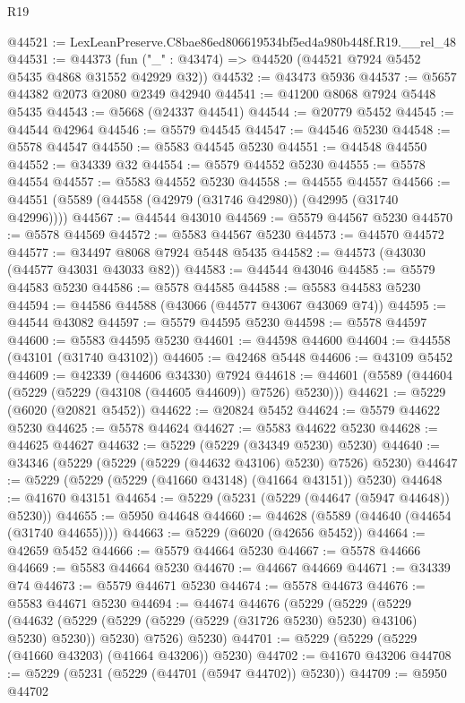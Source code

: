\begin{lexlean}{R19}
\begin{coremodule}
@44521 := LexLeanPreserve.C8bae86ed806619534bf5ed4a980b448f.R19.__rel_48
@44531 := @44373 (fun ("_" : @43474) => @44520 (@44521 @7924 @5452 @5435 @4868 @31552 @42929 @32))
@44532 := @43473 @5936
@44537 := @5657 @44382 @2073 @2080 @2349 @42940
@44541 := @41200 @8068 @7924 @5448 @5435
@44543 := @5668 (@24337 @44541)
@44544 := @20779 @5452
@44545 := @44544 @42964
@44546 := @5579 @44545
@44547 := @44546 @5230
@44548 := @5578 @44547
@44550 := @5583 @44545 @5230
@44551 := @44548 @44550
@44552 := @34339 @32
@44554 := @5579 @44552 @5230
@44555 := @5578 @44554
@44557 := @5583 @44552 @5230
@44558 := @44555 @44557
@44566 := @44551 (@5589 (@44558 (@42979 (@31746 @42980)) (@42995 (@31740 @42996))))
@44567 := @44544 @43010
@44569 := @5579 @44567 @5230
@44570 := @5578 @44569
@44572 := @5583 @44567 @5230
@44573 := @44570 @44572
@44577 := @34497 @8068 @7924 @5448 @5435
@44582 := @44573 (@43030 (@44577 @43031 @43033 @82))
@44583 := @44544 @43046
@44585 := @5579 @44583 @5230
@44586 := @5578 @44585
@44588 := @5583 @44583 @5230
@44594 := @44586 @44588 (@43066 (@44577 @43067 @43069 @74))
@44595 := @44544 @43082
@44597 := @5579 @44595 @5230
@44598 := @5578 @44597
@44600 := @5583 @44595 @5230
@44601 := @44598 @44600
@44604 := @44558 (@43101 (@31740 @43102))
@44605 := @42468 @5448
@44606 := @43109 @5452
@44609 := @42339 (@44606 @34330) @7924
@44618 := @44601 (@5589 (@44604 (@5229 (@5229 (@43108 (@44605 @44609)) @7526) @5230)))
@44621 := @5229 (@6020 (@20821 @5452))
@44622 := @20824 @5452
@44624 := @5579 @44622 @5230
@44625 := @5578 @44624
@44627 := @5583 @44622 @5230
@44628 := @44625 @44627
@44632 := @5229 (@5229 (@34349 @5230) @5230)
@44640 := @34346 (@5229 (@5229 (@5229 (@44632 @43106) @5230) @7526) @5230)
@44647 := @5229 (@5229 (@5229 (@41660 @43148) (@41664 @43151)) @5230)
@44648 := @41670 @43151
@44654 := @5229 (@5231 (@5229 (@44647 (@5947 @44648)) @5230))
@44655 := @5950 @44648
@44660 := @44628 (@5589 (@44640 (@44654 (@31740 @44655))))
@44663 := @5229 (@6020 (@42656 @5452))
@44664 := @42659 @5452
@44666 := @5579 @44664 @5230
@44667 := @5578 @44666
@44669 := @5583 @44664 @5230
@44670 := @44667 @44669
@44671 := @34339 @74
@44673 := @5579 @44671 @5230
@44674 := @5578 @44673
@44676 := @5583 @44671 @5230
@44694 := @44674
    @44676
    (@5229
      (@5229
        (@5229
          (@44632 (@5229 (@5229 (@5229 (@5229 (@31726 @5230) @5230) @43106) @5230) @5230))
          @5230)
        @7526)
      @5230)
@44701 := @5229 (@5229 (@5229 (@41660 @43203) (@41664 @43206)) @5230)
@44702 := @41670 @43206
@44708 := @5229 (@5231 (@5229 (@44701 (@5947 @44702)) @5230))
@44709 := @5950 @44702

\end{coremodule}
\end{lexlean}
